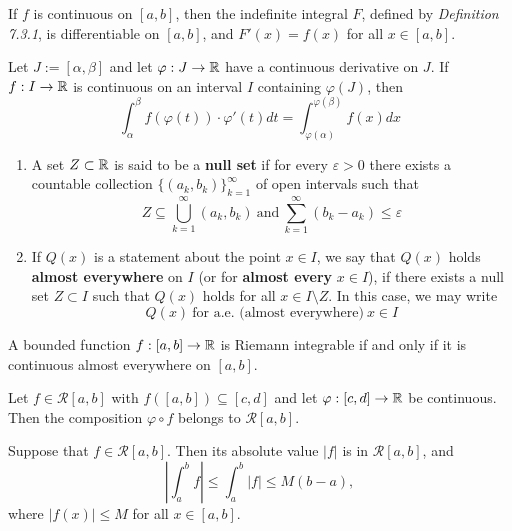 \begin{theorem}
	If $f$ is continuous on $[a,b]$, then the indefinite integral $F$, defined by \textit{Definition 7.3.1}, is differentiable on $[a,b]$, and $F'(x)=f(x)$ for all $x \in [a,b]$.
\end{theorem}

\begin{theorem}
	Let $J:=[\alpha, \beta]$ and let $\varphi:J\to\mathbb{R}$ have a continuous derivative on $J$. If $f:I\to\mathbb{R}$ is continuous on an interval $I$ containing $\varphi(J)$, then
	\[\displaystyle\int_{\alpha}^{\beta}f(\varphi(t))\cdot\varphi'(t)dt=\displaystyle\int_{\varphi(\alpha)}^{\varphi(\beta)}f(x)dx\]
\end{theorem}

\begin{definition}

	\begin{enumerate}
		\item A set $Z \subset \mathbb{R}$ is said to be a \textbf{null set} if for every $\varepsilon>0$ there exists a countable collection $\{(a_k,b_k)\}_{k=1}^\infty$ of open intervals such that
		      \[Z \subseteq \bigcup_{k=1}^{\infty}(a_k,b_k)\ \text{and}\ \sum\limits_{k=1}^{\infty}(b_k-a_k)\leq \varepsilon\]

		\item If $Q(x)$ is a statement about the point $x \in I$, we say that $Q(x)$ holds \textbf{almost everywhere} on $I$ (or for \textbf{almost every} $x \in I$), if there exists a null set $Z \subset I$ such that $Q(x)$ holds for all $x \in I\setminus Z$. In this case, we may write
		      \[Q(x)\ \text{for a.e. (almost everywhere)}\ x \in I\]
	\end{enumerate}
\end{definition}

\begin{theorem}
	A bounded function $f:[a,b] \to \mathbb{R}$ is Riemann integrable if and only if it is continuous almost everywhere on $[a,b]$.
\end{theorem}

\begin{theorem}
	Let $f \in \mathcal{R}[a,b]$ with $f([a,b])\subseteq [c,d]$ and let $\varphi:[c,d] \to \mathbb{R}$ be continuous. Then the composition $\varphi \circ f$ belongs to $\mathcal{R}[a,b]$.
\end{theorem}

\begin{corollary}
	Suppose that $f \in \mathcal{R}[a,b]$. Then its absolute value $|f|$ is in $\mathcal{R}[a,b]$, and
	\[\left|\displaystyle\int_{a}^{b}f\right|\leq\displaystyle\int_{a}^{b}|f|\leq M(b-a),\]
	where $|f(x)|\leq M$ for all $x \in [a,b]$.
\end{corollary}

